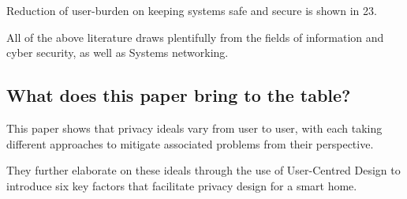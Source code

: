 Reduction of user-burden on keeping systems safe and secure is shown in 23.


All of the above literature draws plentifully from the fields of information and cyber security,  as well as Systems networking.

\subsection{What does this paper bring to the table?}

This paper shows that privacy ideals vary from user to user, with each taking different approaches to mitigate associated problems from their perspective. 

They further elaborate on these ideals through the use of User-Centred Design to introduce six key factors that facilitate privacy design for a smart home.
